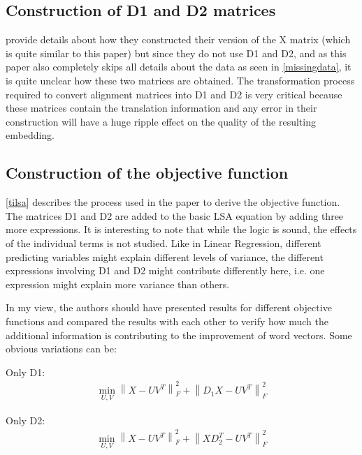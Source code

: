 \documentclass[11pt]{article}
\begin{document}
\subsection{Construction of D1 and D2 matrices}
\cite{faruqui2014improving} provide details about how they constructed their version of the X matrix (which is quite similar to this paper) but since they do not use D1 and D2, and as this paper also completely skips all details about the data as seen in \ref{missingdata}, it is quite unclear how these two matrices are obtained. The transformation process required to convert alignment matrices into D1 and D2 is very critical because these matrices contain the translation information and any error in their construction will have a huge ripple effect on the quality of the resulting embedding.

\subsection{Construction of the objective function}
\ref{tilsa} describes the process used in the paper to derive the objective function. The matrices D1 and D2 are added to the basic LSA equation by adding three more expressions. It is interesting to note that while the logic is sound, the effects of the individual terms is not studied. Like in Linear Regression, different predicting variables might explain different levels of variance, the different expressions involving D1 and D2 might contribute differently here, i.e. one expression might explain more variance than others.

In my view, the authors should have presented results for different objective functions and compared the results with each other to verify how much the additional information is contributing to the improvement of word vectors. Some obvious variations can be:

Only D1:
\begin{multline}
\min_{U,V}\left\lVert X - UV^T \right\rVert^{2}_F + \left\lVert D_{1}X - UV^T \right\rVert^{2}_F
\end{multline}

Only D2:
\begin{multline}
\min_{U,V}\left\lVert X - UV^T \right\rVert^{2}_F + \left\lVert XD^{T}_2 - UV^T \right\rVert^{2}_F
\end{multline}
\end{document}

